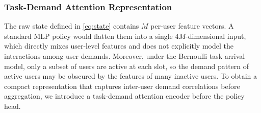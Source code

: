 \documentclass[journal]{IEEEtran}
\begin{document}

\subsubsection{Task-Demand Attention Representation}
\label{subsec:attention}

The raw state defined in \eqref{eq:state} contains \(M\) per-user feature
vectors. A standard MLP policy would flatten them into a single
\(4M\)-dimensional input, which directly mixes user-level features and does
not explicitly model the interactions among user demands. Moreover, under
the Bernoulli task arrival model, only a subset of users are active at each
slot, so the demand pattern of active users may be obscured by the features
of many inactive users. To obtain a compact representation that captures
inter-user demand correlations before aggregation, we introduce a
task-demand attention encoder before the policy head.
\end{document}
